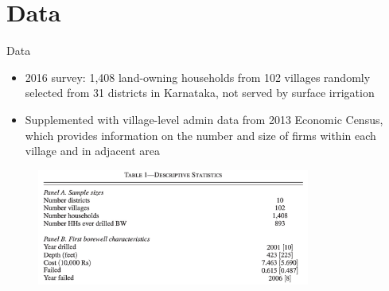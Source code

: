 \documentclass[10pt]{beamer}
\begin{document}
\section{Data}
\begin{frame}
	{Data}
	\begin{itemize}
		\item 2016 survey: 1,408 land-owning households from 102 villages randomly selected from 31 districts in Karnataka, not served by surface irrigation
		\item Supplemented with village-level admin data from 2013 Economic Census, which provides information on the number and size of firms within each village and in adjacent area
	\end{itemize}
	\begin{figure}
		\centering
		\includegraphics[width=0.8\textwidth]{table1_ab.png}
	\end{figure}
\end{frame}
\end{document}
